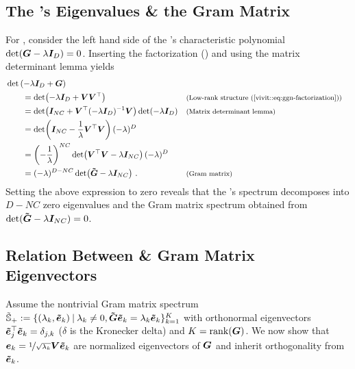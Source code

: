 \subsection{The \gnn's Eigenvalues \& the Gram
  Matrix}\label{vivit::sec:relation-ggn-gram-eigenvalues}

For , consider the left hand side of the \ggn's
characteristic polynomial $\det({\bm{G}} - \lambda {\bm{I}}_D) = 0$. Inserting the \vivit
factorization () and using the matrix determinant
lemma yields
\begin{align*}
  &\det\left(
  - \lambda \mI_D + \mG
  \right)
  \\
  &\qquad =
    \det\!\left(
    - \lambda \mI_D + \mV\mV^\top
    \right)
    \explainmath{(Low-rank structure (\ref{vivit::eq:ggn-factorization}))}
  \\
  &\qquad=
    \det\!\left(
    \mI_{NC} + \mV^\top (-\lambda \mI_D)^{-1} \mV
    \right)
    \det\!\left(
    -\lambda \mI_D
    \right)
    \explainmath{(Matrix determinant lemma)}
  \\
  &\qquad=
    \det\!\left(
    \mI_{NC} - \frac{1}{\lambda} \mV^\top \mV
    \right)
    (-\lambda)^D
    \explainmath{\empty}
  \\
  &\qquad=
    \left(-\frac{1}{\lambda}\right)^{NC}
    \det\!\left(
    \mV^\top \mV - \lambda \mI_{NC}
    \right)
    (-\lambda)^D
    \explainmath{\empty}
  \\
  &\qquad=
    (-\lambda)^{D - NC}
    \det\!\left(
    \mGtilde - \lambda \mI_{NC}
    \right)\,.
    \explainmath{(Gram matrix)}
\end{align*}
Setting the above expression to zero reveals that the \ggn's spectrum decomposes
into $D-NC$ zero eigenvalues and the Gram matrix spectrum obtained from
$\det(\bm{\tilde{{\bm{G}}}} - \lambda {\bm{I}}_{NC} )= 0$.

\subsection{Relation Between \ggn \& Gram Matrix Eigenvectors}
\label{vivit::sec:relation-ggn-gram-eigenvectors}

Assume the nontrivial Gram matrix spectrum $\tilde{{\mathbb{S}}}_+ := \{(\lambda_k,
\bm{\tilde{e}}_k)\:|\: \lambda_k \neq 0, \bm{\tilde{{\bm{G}}}} \bm{\tilde{e}}_k = \lambda_k \bm{\tilde{e}}_k
\}_{k=1}^K$ with orthonormal eigenvectors $\bm{\tilde{e}}_j^\top \bm{\tilde{e}}_k =
\delta_{j,k}$ ($\delta$ is the Kronecker delta) and $K = \mathrm{rank}({\bm{G}})$. We
now show that ${\bm{e}}_k = \nicefrac{1}{\sqrt{\lambda_k}} {\bm{V}} \bm{\tilde{e}}_k$ are
normalized eigenvectors of ${\bm{G}}$ and inherit orthogonality from $\bm{\tilde{e}}_k$.

